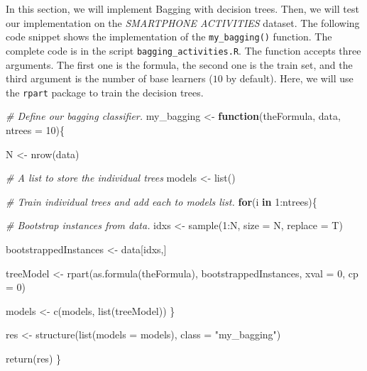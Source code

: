 \documentclass[
  11pt,
]{krantz}
\newenvironment{Shaded}{\begin{snugshade}}{\end{snugshade}}
\newcommand{\AttributeTok}[1]{\textcolor[rgb]{0.61,0.61,0.61}{#1}}
\newcommand{\CommentTok}[1]{\textcolor[rgb]{0.37,0.37,0.37}{\textit{#1}}}
\newcommand{\ControlFlowTok}[1]{\textcolor[rgb]{0.27,0.27,0.27}{\textbf{#1}}}
\newcommand{\DecValTok}[1]{\textcolor[rgb]{0.06,0.06,0.06}{#1}}
\newcommand{\FunctionTok}[1]{\textcolor[rgb]{0,0,0}{#1}}
\newcommand{\NormalTok}[1]{#1}
\newcommand{\OtherTok}[1]{\textcolor[rgb]{0.37,0.37,0.37}{#1}}
\newcommand{\SpecialCharTok}[1]{\textcolor[rgb]{0,0,0}{#1}}
\newcommand{\StringTok}[1]{\textcolor[rgb]{0.5,0.5,0.5}{#1}}
\begin{document}
In this section, we will implement Bagging with decision trees. Then, we will test our implementation on the \emph{SMARTPHONE ACTIVITIES} dataset. The following code snippet shows the implementation of the \texttt{my\_bagging()} function. The complete code is in the script \texttt{bagging\_activities.R}. The function accepts three arguments. The first one is the formula, the second one is the train set, and the third argument is the number of base learners (\(10\) by default). Here, we will use the \texttt{rpart} package to train the decision trees.

\begin{Shaded}
\begin{Highlighting}[]
\CommentTok{\# Define our bagging classifier.}
\NormalTok{my\_bagging }\OtherTok{\textless{}{-}} \ControlFlowTok{function}\NormalTok{(theFormula, data, }\AttributeTok{ntrees =} \DecValTok{10}\NormalTok{)\{}
  
\NormalTok{  N }\OtherTok{\textless{}{-}} \FunctionTok{nrow}\NormalTok{(data)}
  
  \CommentTok{\# A list to store the individual trees}
\NormalTok{  models }\OtherTok{\textless{}{-}} \FunctionTok{list}\NormalTok{()}
  
  \CommentTok{\# Train individual trees and add each to \textquotesingle{}models\textquotesingle{} list.}
  \ControlFlowTok{for}\NormalTok{(i }\ControlFlowTok{in} \DecValTok{1}\SpecialCharTok{:}\NormalTok{ntrees)\{}
    
    \CommentTok{\# Bootstrap instances from data.}
\NormalTok{    idxs }\OtherTok{\textless{}{-}} \FunctionTok{sample}\NormalTok{(}\DecValTok{1}\SpecialCharTok{:}\NormalTok{N, }\AttributeTok{size =}\NormalTok{ N, }\AttributeTok{replace =}\NormalTok{ T)}
    
\NormalTok{    bootstrappedInstances }\OtherTok{\textless{}{-}}\NormalTok{ data[idxs,]}
    
\NormalTok{    treeModel }\OtherTok{\textless{}{-}} \FunctionTok{rpart}\NormalTok{(}\FunctionTok{as.formula}\NormalTok{(theFormula),}
\NormalTok{                       bootstrappedInstances,}
                       \AttributeTok{xval =} \DecValTok{0}\NormalTok{,}
                       \AttributeTok{cp =} \DecValTok{0}\NormalTok{)}
    
\NormalTok{    models }\OtherTok{\textless{}{-}} \FunctionTok{c}\NormalTok{(models, }\FunctionTok{list}\NormalTok{(treeModel))}
\NormalTok{  \}}
  
\NormalTok{  res }\OtherTok{\textless{}{-}} \FunctionTok{structure}\NormalTok{(}\FunctionTok{list}\NormalTok{(}\AttributeTok{models =}\NormalTok{ models),}
                   \AttributeTok{class =} \StringTok{"my\_bagging"}\NormalTok{)}
  
  \FunctionTok{return}\NormalTok{(res)}
\NormalTok{\}}
\end{Highlighting}
\end{Shaded}
\end{document}
